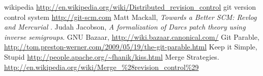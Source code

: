 \documentclass[12pt]{article}
\begin{document}
\begin{thebibliography}{99}
wikipedia \url{http://en.wikipedia.org/wiki/Distributed_revision_control}
git version control system \url{http://git-scm.com}
Matt Mackall, \emph{Towards a Better SCM: Revlog and Mercurial} .
Judah Jacobson, \emph{A formalization of Darcs patch theory using inverse
  semigroups}.
GNU Bazaar, \url{http://wiki.bazaar.canonical.com/}
Git Parable,
\url{http://tom.preston-werner.com/2009/05/19/the-git-parable.html}
Keep it Simple, Stupid
\url{http://people.apache.org/~fhanik/kiss.html}
Merge Strategies.
\url{http://en.wikipedia.org/wiki/Merge_%28revision_control%29}
\end{thebibliography}
\end{document}
